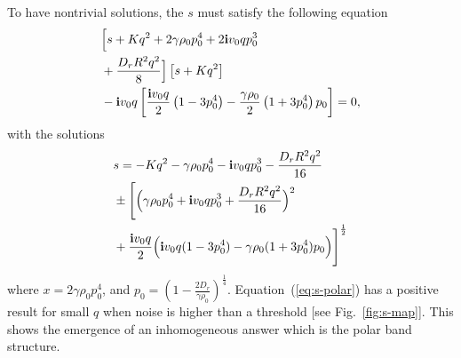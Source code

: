 \documentclass[reprint,floatfix,amsmath,amssymb,aps,pre,showkeys,showpacs,superscriptaddress]{revtex4-1}
\newcommand{\p}{p}
\newcommand{\im}{{\rm \bf i}}
\begin{document}
To have nontrivial solutions, the $s$ must satisfy the following equation
\begin{equation}
\begin{aligned}
&\Big[ s + K q^2 + 2 \gamma \rho_0 \p_0^4 + 2 \im v_0 q \p_0^3 \\
&+ \frac{D_r R^2 q^2}{8}  \Big] \left[ s + K q^2 \right] \\
&- \im v_0 q \left[ \frac{\im v_0 q}{2} \left( 1 - 3\p_0^4 \right) - \frac{\gamma \rho_0}{2} \left( 1 + 3 \p_0^4 \right) \p_0  \right]  = 0,
\end{aligned}
\end{equation}
with the solutions
\begin{equation}
\begin{aligned}
&s = - Kq^2 -\gamma \rho_0 \p_0^4 - \im v_0 q \p_0^3 - \frac{D_r R^2 q^2}{16} \\
&\pm \Bigg[ \Big( \gamma \rho_0 \p_0^4 + \im v_0 q \p_0^3 + \frac{D_r R^2 q^2}{16} \Big)^2 \\
&+ \frac{\im v_0 q}{2} \Big( \im v_0 q (1 - 3\p_0^4) - \gamma \rho_0 (1 + 3 \p_0^4) \p_0 \Big)  \Bigg]^\frac{1}{2}
\end{aligned}
\label{eq:s-polar}
\end{equation}
where $x = 2 \gamma \rho_0 \p_0^4$, and $\p_0 = (1 - \frac{2 D_r}{\gamma \rho_0})^{\tfrac{1}{4}}$. Equation~(\ref{eq:s-polar}) has a positive result for small $q$ when noise is higher than a threshold [see Fig.~\ref{fig:s-map}]. This shows the emergence of an inhomogeneous answer which is the polar band structure.

%



%
\end{document}
